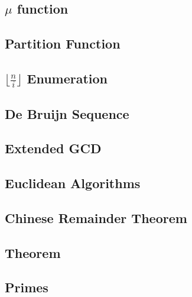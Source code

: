 \documentclass[a4paper,10pt,twocolumn,oneside]{article}
\begin{document}
\subsection{$\mu$ function}

\subsection{Partition Function}

\subsection{$\lfloor \frac{n}{i} \rfloor$ Enumeration}

\subsection{De Bruijn Sequence}

\subsection{Extended GCD}

\subsection{Euclidean Algorithms}

\subsection{Chinese Remainder Theorem}

% 
% 
% 
\subsection{Theorem}

\subsection{Primes}

\end{document}
